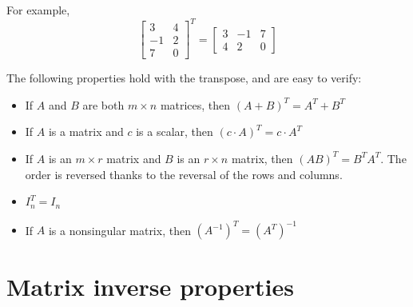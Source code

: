 \documentclass{article}
\begin{document}
For example, 
\[\begin{bmatrix} 3 & 4 \\ -1 & 2 \\ 7 & 0 \end{bmatrix}^T = \begin{bmatrix} 3 & -1 & 7 \\ 4 & 2 & 0 \end{bmatrix}\]

The following properties hold with the transpose, and are easy to verify:
\begin{itemize}
\item If \(A\) and \(B\) are both \(m \times n\) matrices, then \((A + B)^T = A^T + B^T\)
\item If \(A\) is a matrix and \(c\) is a scalar, then \((c \cdot A)^T = c \cdot A^T\)
\item If \(A\) is an \(m \times r\) matrix and \(B\) is an \(r \times n\) matrix, then \((AB)^T = B^T A^T\). The order is reversed thanks to the reversal of the rows and columns.
\item \(I_n^T = I_n\)
\item If \(A\) is a nonsingular matrix, then \((A^{-1})^T = (A^T)^{-1}\) 
\end{itemize}



\section*{Matrix inverse properties}
\end{document}
